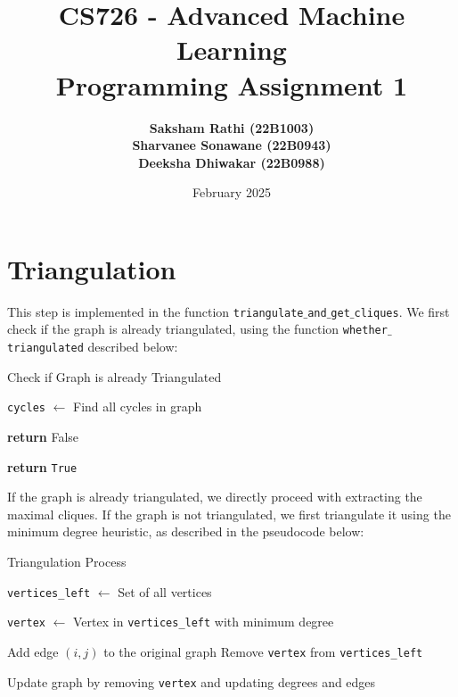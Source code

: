 \documentclass{article}
\begin{document}
\title{\Huge \textbf{CS726 - Advanced Machine Learning \\ Programming Assignment 1} }
\author{
\textbf{Saksham Rathi (22B1003)}\\
\textbf{Sharvanee Sonawane (22B0943)}\\
\textbf{Deeksha Dhiwakar (22B0988)}
}
\date{February 2025}
\maketitle\clearpage
\section{Triangulation}
This step is implemented in the function \texttt{triangulate}$\_$\texttt{and}$\_$\texttt{get}$\_$\texttt{cliques}. We first check if the graph is already triangulated, using the function \texttt{whether}$\_$\texttt{triangulated} described below:
\begin{algorithm}
\caption{Check if Graph is already Triangulated}
\begin{algorithmic}[1]

    \State \texttt{cycles} $\gets$ Find all cycles in graph


                \State \textbf{return} False
            \EndIf
        \EndIf
    \EndFor

        \State \textbf{return} \texttt{True}
\end{algorithmic}
\end{algorithm}


If the graph is already triangulated, we directly proceed with extracting the maximal cliques. If the graph is not triangulated, we first triangulate it using the minimum degree heuristic, as described in the pseudocode below:

\begin{algorithm}
\caption{Triangulation Process}
\begin{algorithmic}[1]

    \State \texttt{vertices\_left} $\gets$ Set of all vertices



        \State \texttt{vertex} $\gets$ Vertex in \texttt{vertices\_left} with minimum degree

                \State Add edge $(i, j)$ to the original graph
            \EndIf
        \EndFor
        \State Remove \texttt{vertex} from \texttt{vertices\_left}

        \State Update graph by removing \texttt{vertex} and updating degrees and edges
    \EndWhile
\end{algorithmic}
\end{algorithm}
\end{document}
